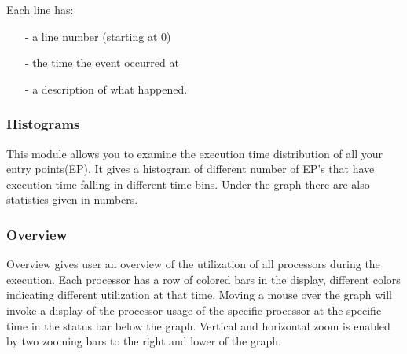 \documentclass[10pt,dvips]{article}
\begin{document}
   Each line has:
   \begin{itemize}
   \item[-] a line number (starting at 0)
   \item[-] the time the event occurred at
   \item[-] a description of what happened.
   \end{itemize}

\subsubsection{Histograms}

This module allows you to examine the execution time distribution of all your
entry points(EP). It gives a histogram of different number of EP's that have
execution time falling in different time bins. Under the graph there are also
statistics given in numbers.

\subsubsection{Overview}

Overview gives user an overview of the utilization of all processors during the
execution. Each processor has a row of colored bars in the display, different colors
indicating different utilization at that time. Moving a mouse over the graph
will invoke a display of the processor usage of the specific processor at the
specific time in the status bar below the graph. Vertical and horizontal zoom is
enabled by two zooming bars to the right and lower of the graph.
\end{document}
